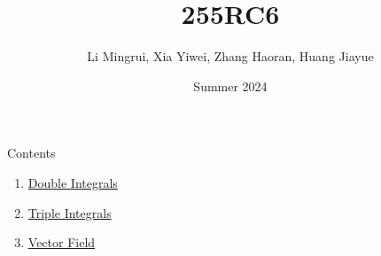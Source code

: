 \documentclass{beamer}
\title{\LARGE 255RC6}
\author{ Li Mingrui, Xia Yiwei, Zhang Haoran, Huang Jiayue}
\date{Summer 2024}
\begin{document}
\maketitle



\begin{frame}{Contents}
    \begin{enumerate}
        \item \hyperlink{1}{Double Integrals}
        \item \hyperlink{2}{Triple Integrals}
        \item \hyperlink{3}{Vector Field}
    \end{enumerate}
       
\end{frame}

    
\end{document}
